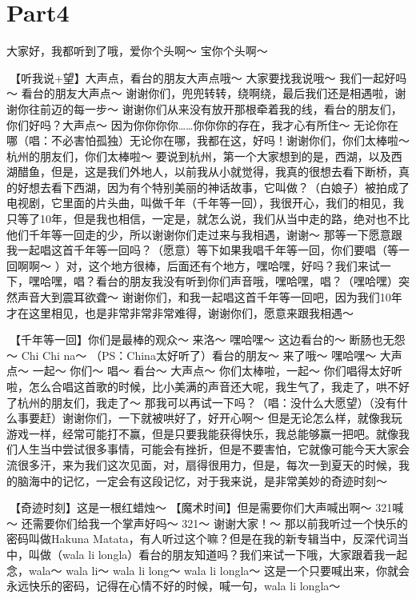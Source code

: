 \documentclass[
]{book}
\begin{document}
\section{Part4}\label{hangzhou-20240823-part4}

大家好，我都听到了哦，爱你个头啊～ 宝你个头啊～

🎵【听我说+望】大声点，看台的朋友大声点哦～ 大家要找我说哦～ 我们一起好吗～ 看台的朋友大声点～ 谢谢你们，兜兜转转，绕啊绕，最后我们还是相遇啦，谢谢你往前迈的每一步～ 谢谢你们从来没有放开那根牵着我的线，看台的朋友们，你们好吗？大声点～ 因为你你你你\ldots\ldots 你你你的存在，我才心有所住～ 无论你在哪（唱：不必害怕孤独）无论你在哪，我都在这，好吗！谢谢你们，你们太棒啦～ 杭州的朋友们，你们太棒啦～
要说到杭州，第一个大家想到的是，西湖，以及西湖醋鱼，但是，这是我们外地人，以前我从小就觉得，我真的很想去看下断桥，真的好想去看下西湖，因为有个特别美丽的神话故事，它叫做？（白娘子）被拍成了电视剧，它里面的片头曲，叫做千年（千年等一回），我很开心，我们的相见，我只等了10年，但是我也相信，一定是，就怎么说，我们从当中走的路，绝对也不比他们千年等一回走的少，所以谢谢你们走过来与我相遇，谢谢～ 那等一下愿意跟我一起唱这首千年等一回吗？（愿意）等下如果我唱千年等一回，你们要唱（等一回啊啊～ ）对，这个地方很棒，后面还有个地方，嘿哈嘿，好吗？我们来试一下，嘿哈嘿，唱？看台的朋友我没有听到你们声音哦，嘿哈嘿，唱？（嘿哈嘿）突然声音大到震耳欲聋～ 谢谢你们，和我一起唱这首千年等一回吧，因为我们10年才在这里相见，也是非常非常非常难得，谢谢你们，愿意来跟我相遇～

🎵【千年等一回】你们是最棒的观众～ 来洛～ 嘿哈嘿～ 这边看台的～ 断肠也无怨～ Chi Chi na～ （PS：China太好听了）看台的朋友～ 来了哦～ 嘿哈嘿～ 大声点～ 一起～ 你们～ 唱～ 看台～ 大声点～ 你们太棒啦，一起～ 你们唱得太好听啦，怎么合唱这首歌的时候，比小美满的声音还大呢，我生气了，我走了，哄不好了杭州的朋友们，我走了～ 那我可以再试一下吗？（唱：没什么大愿望）（没有什么事要赶）谢谢你们，一下就被哄好了，好开心啊～ 但是无论怎么样，就像我玩游戏一样，经常可能打不赢，但是只要我能获得快乐，我总能够赢一把吧。就像我们人生当中尝试很多事情，可能会有挫折，但是不要害怕，它就像可能今天大家会流很多汗，来为我们这次见面，对，扇得很用力，但是，每次一到夏天的时候，我的脑海中的记忆，一定会有这段记忆，对于我来说，是非常美妙的奇迹时刻～

🎵【奇迹时刻】这是一根红蜡烛～ 【魔术时间】但是需要你们大声喊出啊～ 321喊～ 还需要你们给我一个掌声好吗～ 321～ 谢谢大家！～
那以前我听过一个快乐的密码叫做Hakuna Matata，有人听过这个嘛？但是在我的新专辑当中，反深代词当中，叫做（wala li longla）看台的朋友知道吗？我们来试一下哦，大家跟着我一起念，wala～ wala li～ wala li long～ wala li longla～ 这是一个只要喊出来，你就会永远快乐的密码，记得在心情不好的时候，喊一句，wala li longla～
\end{document}

